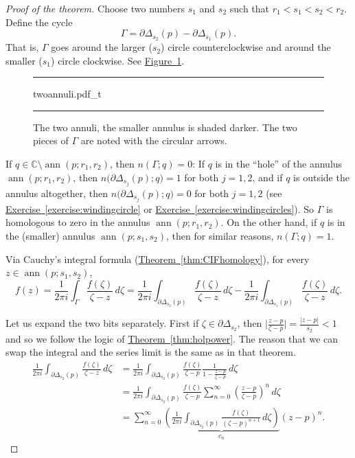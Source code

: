 \documentclass[12pt,openany]{book}
\newcommand{\ann}{\operatorname{ann}}
\newcommand{\sabs}[1]{\lvert {#1} \rvert}
\newcommand{\babs}[1]{\bigl\lvert {#1} \bigr\rvert}
\newcommand{\C}{{\mathbb{C}}}
\newcommand{\myquote}[1]{``#1''}
\theoremstyle{plain}
\theoremstyle{remark}
\theoremstyle{definition}
\newenvironment{myfig}{%
\begin{figure}[h!t]
\noindent\rule{\textwidth}{0.5pt}\vspace{12pt}\par\centering}%
{\par\noindent\rule{\textwidth}{0.5pt}
\end{figure}}
\theoremstyle{exercise}
\theoremstyle{example}
\newcommand{\figureref}[1]{\hyperref[#1]{Figure~\ref*{#1}}}
\newcommand{\exerciseref}[1]{\hyperref[#1]{Exercise~\ref*{#1}}}
\newcommand{\thmref}[1]{\hyperref[#1]{Theorem~\ref*{#1}}}
\begin{document}
\begin{proof}[Proof of the theorem]
Choose two numbers $s_1$ and $s_2$ such that $r_1 < s_1 < s_2 < r_2$.
Define the cycle
\begin{equation*}
\Gamma = \partial \Delta_{s_2}(p) - \partial \Delta_{s_1}(p) .
\end{equation*}
That is, $\Gamma$ goes around the larger ($s_2$) circle counterclockwise and
around the smaller ($s_1$) circle clockwise.
See \figureref{fig:twoannuli}.

\begin{myfig}
{twoannuli.pdf_t}
\caption{The two annuli, the smaller annulus is shaded darker.  The two
pieces of $\Gamma$ are noted with the circular arrows.\label{fig:twoannuli}}
\end{myfig}

If $q \in \C \setminus \ann(p;r_1,r_2)$, then $n(\Gamma;q) = 0$:
If $q$ is in the \myquote{hole} of the annulus $\ann(p;r_1,r_2)$, then
$n\bigl(\partial \Delta_{s_j}(p);q\bigr) = 1$ for both $j=1,2$, and 
if $q$ is outside the annulus altogether, then
$n\bigl(\partial \Delta_{s_j}(p);q\bigr) = 0$ for both $j=1,2$ 
(see \exerciseref{exercise:windingcircle} or
\exerciseref{exercise:windingcircles}).
So $\Gamma$ is homologous to zero in the annulus $\ann(p;r_1,r_2)$.
On the other hand, if $q$ is in the (smaller) annulus $\ann(p;s_1,s_2)$,
then for similar reasons, $n(\Gamma;q) = 1$.

Via Cauchy's integral formula (\thmref{thm:CIFhomology}), for every $z \in \ann(p;s_1,s_2)$,
\begin{equation*}
f(z) = 
\frac{1}{2\pi i}
\int_{\Gamma} \frac{f(\zeta)}{\zeta-z} \, d\zeta 
=
\frac{1}{2\pi i}
\int_{\partial \Delta_{s_2}(p)} \frac{f(\zeta)}{\zeta-z} \, d\zeta 
-
\frac{1}{2\pi i}
\int_{\partial \Delta_{s_1}(p)} \frac{f(\zeta)}{\zeta-z} \, d\zeta  .
\end{equation*}

Let us expand the two bits separately.  First
if $\zeta \in \partial \Delta_{s_2}$, then
$\babs{\frac{z-p}{\zeta-p}} = \frac{\sabs{z-p}}{s_2} < 1$ and so
we follow the logic of \thmref{thm:holpower}.  The reason that we can
swap the integral and the series limit is the same as in that theorem.
\begin{equation*}
\begin{split}
\frac{1}{2\pi i}
\int_{\partial \Delta_{s_2}(p)} \frac{f(\zeta)}{\zeta-z} \, d\zeta 
& =
\frac{1}{2\pi i}
\int_{\partial \Delta_{s_2}(p)} \frac{f(\zeta)}{\zeta-p}
\frac{1}{1-\frac{z-p}{\zeta-p}} \, d\zeta
\\
& =
\frac{1}{2\pi i}
\int_{\partial \Delta_{s_2}(p)} \frac{f(\zeta)}{\zeta-p}
\sum_{n=0}^\infty
{\left(\frac{z-p}{\zeta-p}\right)}^n \, d\zeta
\\
& =
\sum_{n=0}^\infty
\underbrace{
\left(
\frac{1}{2\pi i}
\int_{\partial \Delta_{s_2}(p)} \frac{f(\zeta)}{{(\zeta-p)}^{n+1}}
 \, d\zeta
\right)
}_{c_n}
{(z-p)}^n .
\end{split}
\end{equation*}


\end{proof}
\end{document}
